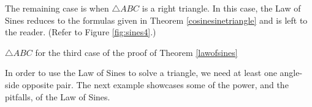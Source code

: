 The remaining case is when $\triangle ABC$ is a right triangle.  In this case, the Law of Sines reduces to the formulas given in Theorem \ref{cosinesinetriangle} and is left to the reader. (Refer to Figure \ref{fig:sines4}.)

\medskip

\noindent\begin{minipage}{\textwidth}
\begin{center}
\end{center}
\captionsetup{type=figure}
\caption{$\triangle ABC$ for the third case of the proof of Theorem \ref{lawofsines}}\label{fig:sines4}
\end{minipage}

\medskip

 In order to use the Law of Sines to solve a triangle, we need at least one angle-side opposite pair.  The next example showcases some of the power, and the pitfalls, of the Law of Sines.

\medskip

